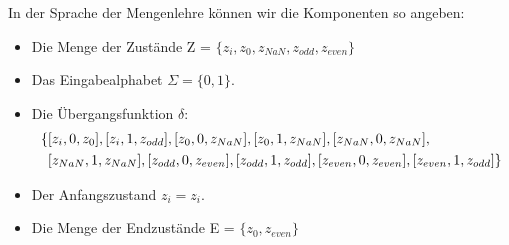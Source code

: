 In der Sprache der Mengenlehre können wir die Komponenten so angeben:
\begin{itemize}

    \item Die Menge der Zustände Z = $\{z_i, z_0, z_{NaN}, z_{odd}, z_{even}\}$
    \item Das Eingabealphabet $\Sigma = \{0,1\}$.
    \item Die Übergangsfunktion $\delta$:
    \begin{align*} \{
     &  [z_i, 0, z_0],
        [z_i, 1, z_{odd}],
        [z_0, 0, z_{NaN}],
        [z_0, 1, z_{NaN}],
        [z_{NaN}, 0, z_{NaN}], \notag\\
     &  [z_{NaN}, 1, z_{NaN}],
        [z_{odd}, 0, z_{even}],
        [z_{odd}, 1, z_{odd}],
        [z_{even}, 0, z_{even}],
        [z_{even}, 1, z_{odd}] \notag
    \} \end{align*}
    \item Der Anfangszustand $z_i = z_i$.
    \item Die Menge der Endzustände E = $\{z_0, z_{even}\}$ 
\end{itemize}

